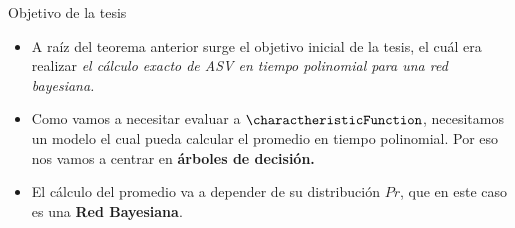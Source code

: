 \begin{frame}{Objetivo de la tesis}
	\begin{itemize}[<+- | alert@+>]
		\item A raíz del teorema anterior surge el objetivo inicial de la tesis, el cuál era realizar \emph{el cálculo exacto de ASV en tiempo polinomial para una red bayesiana.} 
		\item Como vamos a necesitar evaluar a $\charactheristicFunction$, necesitamos un modelo el cual pueda calcular el promedio en tiempo polinomial. Por eso nos vamos a centrar en \textbf{árboles de decisión.}
		\item El cálculo del promedio va a depender de su distribución $Pr$, que en este caso es una \textbf{Red Bayesiana}. 
	\end{itemize}
	
\end{frame}